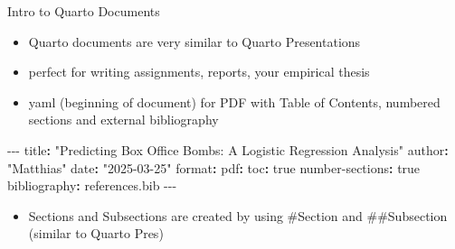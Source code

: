 \documentclass[
  10pt,
  ignorenonframetext,
]{beamer}
\newenvironment{Shaded}{\begin{snugshade}}{\end{snugshade}}
\newcommand{\AttributeTok}[1]{\textcolor[rgb]{0.40,0.45,0.13}{#1}}
\newcommand{\CharTok}[1]{\textcolor[rgb]{0.13,0.47,0.30}{#1}}
\newcommand{\FunctionTok}[1]{\textcolor[rgb]{0.28,0.35,0.67}{#1}}
\newcommand{\KeywordTok}[1]{\textcolor[rgb]{0.00,0.23,0.31}{\textbf{#1}}}
\newcommand{\PreprocessorTok}[1]{\textcolor[rgb]{0.68,0.00,0.00}{#1}}
\newcommand{\StringTok}[1]{\textcolor[rgb]{0.13,0.47,0.30}{#1}}
\providecommand{\tightlist}{%
  \setlength{\itemsep}{0pt}\setlength{\parskip}{0pt}}\usepackage{longtable,booktabs,array}
\begin{document}
\begin{frame}[fragile]{Intro to Quarto Documents}
\label{intro-to-quarto-documents}
\small

\begin{itemize}
\tightlist
\item
  Quarto documents are very similar to Quarto Presentations
\item
  perfect for writing assignments, reports, your empirical thesis
\item
  yaml (beginning of document) for PDF with Table of Contents, numbered
  sections and external bibliography
\end{itemize}

\footnotesize

\begin{Shaded}
\begin{Highlighting}[]
\PreprocessorTok{{-}{-}{-}}
\FunctionTok{title}\KeywordTok{:}\AttributeTok{ }\StringTok{"Predicting Box Office Bombs: A Logistic Regression Analysis"}
\FunctionTok{author}\KeywordTok{:}\AttributeTok{ }\StringTok{"Matthias"}
\FunctionTok{date}\KeywordTok{:}\AttributeTok{ }\StringTok{"2025{-}03{-}25"}
\FunctionTok{format}\KeywordTok{:}
\AttributeTok{  }\FunctionTok{pdf}\KeywordTok{:}
\AttributeTok{    }\FunctionTok{toc}\KeywordTok{:}\AttributeTok{ }\CharTok{true}
\AttributeTok{    }\FunctionTok{number{-}sections}\KeywordTok{:}\AttributeTok{ }\CharTok{true}
\FunctionTok{bibliography}\KeywordTok{:}\AttributeTok{ references.bib}
\PreprocessorTok{{-}{-}{-}}
\end{Highlighting}
\end{Shaded}

\small

\begin{itemize}
\tightlist
\item
  Sections and Subsections are created by using \#Section and
  \#\#Subsection (similar to Quarto Pres)
\end{itemize}
\end{frame}
\end{document}
